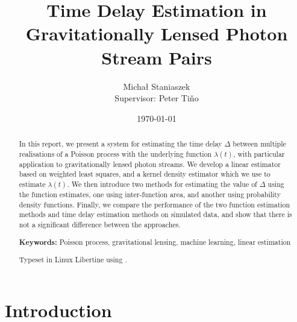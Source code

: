 \documentclass[a4paper,11pt]{article}
\title{Time Delay Estimation in Gravitationally Lensed Photon Stream Pairs}
\author{\Large{Micha{\l} Staniaszek} \\\small{Supervisor: Peter Ti{\v{n}}o}}
\date{\today}
\begin{document}
\maketitle


\thispagestyle{empty}
\newpage
{}
\begin{abstract}
In this report, we present a system for estimating the time delay $\Delta$
between multiple realisations of a Poisson process with the underlying function
$\lambda(t)$, with particular application to gravitationally lensed photon
streams. We develop a linear estimator based on weighted least squares, and a
kernel density estimator which we use to estimate $\lambda(t)$. We then
introduce two methods for estimating the value of $\Delta$ using the function
estimates, one using inter-function area, and another using probability density
functions. Finally, we compare the performance of the two function estimation
methods and time delay estimation methods on simulated data, and show that there
is not a significant difference between the approaches.

\vspace{1.0cm}\textbf{Keywords: }Poisson process, gravitational lensing,
 machine learning, linear estimation

\begin{center}
\vspace*{\fill}\scriptsize{Typeset in Linux Libertine using \XeLaTeX}.
\end{center}
\end{abstract}
\newpage
\tableofcontents
\newpage
{}
\section{Introduction}
\label{sec-1}
\end{document}
